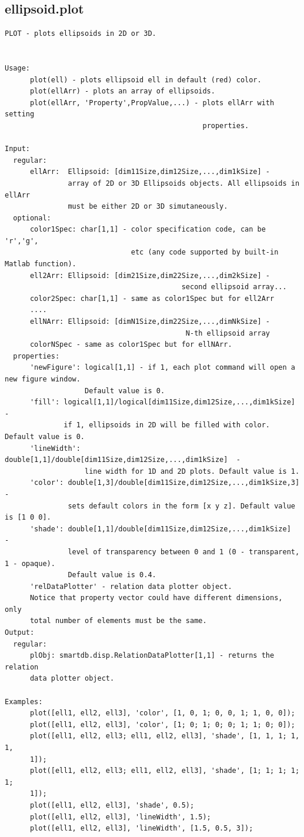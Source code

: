 \documentclass[letterpaper,10pt,english]{sphinxmanual}
\begin{document}
\subsection{ellipsoid.plot}
\label{chap_functions:ellipsoid-plot}
\begin{Verbatim}[commandchars=\\\{\}]
PLOT - plots ellipsoids in 2D or 3D.


Usage:
      plot(ell) - plots ellipsoid ell in default (red) color.
      plot(ellArr) - plots an array of ellipsoids.
      plot(ellArr, 'Property',PropValue,...) - plots ellArr with setting
                                               properties.

Input:
  regular:
      ellArr:  Ellipsoid: [dim11Size,dim12Size,...,dim1kSize] -
               array of 2D or 3D Ellipsoids objects. All ellipsoids in ellArr
               must be either 2D or 3D simutaneously.
  optional:
      color1Spec: char[1,1] - color specification code, can be 'r','g',
                              etc (any code supported by built-in Matlab function).
      ell2Arr: Ellipsoid: [dim21Size,dim22Size,...,dim2kSize] -
                                          second ellipsoid array...
      color2Spec: char[1,1] - same as color1Spec but for ell2Arr
      ....
      ellNArr: Ellipsoid: [dimN1Size,dim22Size,...,dimNkSize] -
                                           N-th ellipsoid array
      colorNSpec - same as color1Spec but for ellNArr.
  properties:
      'newFigure': logical[1,1] - if 1, each plot command will open a new figure window.
                   Default value is 0.
      'fill': logical[1,1]/logical[dim11Size,dim12Size,...,dim1kSize]  -
              if 1, ellipsoids in 2D will be filled with color. Default value is 0.
      'lineWidth': double[1,1]/double[dim11Size,dim12Size,...,dim1kSize]  -
                   line width for 1D and 2D plots. Default value is 1.
      'color': double[1,3]/double[dim11Size,dim12Size,...,dim1kSize,3] -
               sets default colors in the form [x y z]. Default value is [1 0 0].
      'shade': double[1,1]/double[dim11Size,dim12Size,...,dim1kSize]  -
               level of transparency between 0 and 1 (0 - transparent, 1 - opaque).
               Default value is 0.4.
      'relDataPlotter' - relation data plotter object.
      Notice that property vector could have different dimensions, only
      total number of elements must be the same.
Output:
  regular:
      plObj: smartdb.disp.RelationDataPlotter[1,1] - returns the relation
      data plotter object.

Examples:
      plot([ell1, ell2, ell3], 'color', [1, 0, 1; 0, 0, 1; 1, 0, 0]);
      plot([ell1, ell2, ell3], 'color', [1; 0; 1; 0; 0; 1; 1; 0; 0]);
      plot([ell1, ell2, ell3; ell1, ell2, ell3], 'shade', [1, 1, 1; 1, 1,
      1]);
      plot([ell1, ell2, ell3; ell1, ell2, ell3], 'shade', [1; 1; 1; 1; 1;
      1]);
      plot([ell1, ell2, ell3], 'shade', 0.5);
      plot([ell1, ell2, ell3], 'lineWidth', 1.5);
      plot([ell1, ell2, ell3], 'lineWidth', [1.5, 0.5, 3]);
\end{Verbatim}
\end{document}
